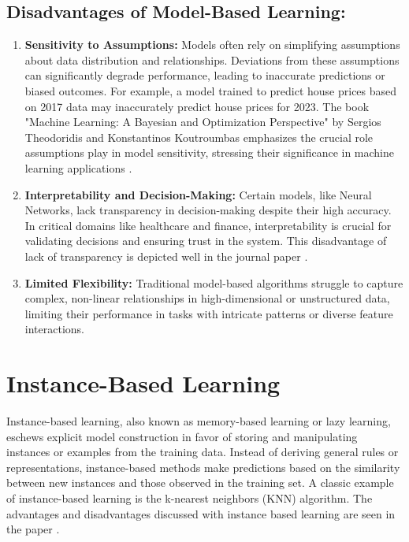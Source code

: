 \documentclass[a4paper, 12pt]{report}
\begin{document}
\subsection{Disadvantages of Model-Based Learning:}
\begin{enumerate}
	\item \textbf{Sensitivity to Assumptions:} Models often rely on simplifying assumptions about data distribution and relationships. 
          Deviations from these assumptions can significantly degrade performance, leading to inaccurate predictions or biased outcomes. 
          For example, a model trained to predict house prices based on 2017 data may inaccurately predict house prices for 2023. 
          The book "Machine Learning: A Bayesian and Optimization Perspective" by Sergios Theodoridis and Konstantinos Koutroumbas 
          emphasizes the crucial role assumptions play in model sensitivity, stressing their significance in machine 
          learning applications \cite{theodoridis2015machine}.
	\item \textbf{Interpretability and Decision-Making:} Certain models, like Neural Networks, lack transparency in decision-making despite their high accuracy.
	      In critical domains like healthcare and finance, interpretability is crucial for validating decisions and ensuring trust in the system. This disadvantage of lack of transparency
          is depicted well in the journal paper \cite{rudin2019stop}.
	\item \textbf{Limited Flexibility:} Traditional model-based algorithms struggle to capture complex, non-linear relationships in high-dimensional or unstructured data,
	      limiting their performance in tasks with intricate patterns or diverse feature interactions. 
\end{enumerate}

\section{Instance-Based Learning}

Instance-based learning, also known as memory-based learning or lazy learning, eschews explicit model construction in favor of storing and manipulating instances or examples from the training data.
Instead of deriving general rules or representations, instance-based methods make predictions based on the similarity between new instances and those observed in the training set. 
A classic example of instance-based learning is the k-nearest neighbors (KNN) algorithm. 
The advantages and disadvantages discussed with instance based learning are seen in the paper \cite{aha1991instance}.
\end{document}
